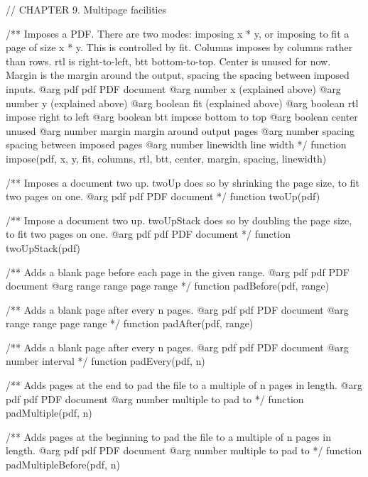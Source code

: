 // CHAPTER 9. Multipage facilities

/** Imposes a PDF. There are two modes: imposing x * y, or imposing to fit a
page of size x * y. This is controlled by fit. Columns imposes by columns
rather than rows. rtl is right-to-left, btt bottom-to-top. Center is unused
for now. Margin is the margin around the output, spacing the spacing between
imposed inputs.
@arg {pdf} pdf PDF document
@arg {number} x (explained above)
@arg {number} y (explained above)
@arg {boolean} fit (explained above)
@arg {boolean} rtl impose right to left
@arg {boolean} btt impose bottom to top
@arg {boolean} center unused
@arg {number} margin margin around output pages
@arg {number} spacing spacing between imposed pages
@arg {number} linewidth line width */
function impose(pdf, x, y, fit, columns, rtl, btt, center, margin, spacing, linewidth) {}

/** Imposes a document two up. twoUp does so by shrinking the page size, to fit
two pages on one.
@arg {pdf} pdf PDF document */
function twoUp(pdf) {}

/** Impose a document two up. twoUpStack does so by doubling the page size,
to fit two pages on one.
@arg {pdf} pdf PDF document */
function twoUpStack(pdf) {}

/** Adds a blank page before each page in the given range.
@arg {pdf} pdf PDF document
@arg {range} range page range */
function padBefore(pdf, range) {}

/** Adds a blank page after every n pages.
@arg {pdf} pdf PDF document
@arg {range} range page range */
function padAfter(pdf, range) {}

/** Adds a blank page after every n pages.
@arg {pdf} pdf PDF document
@arg {number} interval */
function padEvery(pdf, n) {}

/** Adds pages at the end to pad the file to a multiple of n pages in
length.
@arg {pdf} pdf PDF document
@arg {number} multiple to pad to */
function padMultiple(pdf, n) {}

/** Adds pages at the beginning to pad the file to a multiple of n pages in
length.
@arg {pdf} pdf PDF document
@arg {number} multiple to pad to */
function padMultipleBefore(pdf, n) {}


